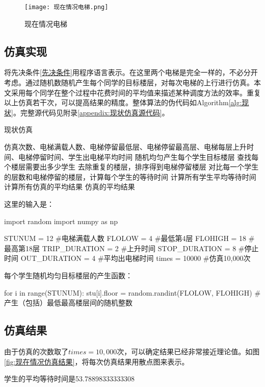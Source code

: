 \documentclass[letterpaper,12pt]{article}
\begin{document}
\begin{figure}[H]

\centering
\texttt{[image: 现在情况电梯.png]}
\caption{现在情况电梯}
\label{fig:现在情况电梯}
 
\end{figure}

\subsection{仿真实现}
将先决条件\ref{先决条件}用程序语言表示。在这里两个电梯是完全一样的，不必分开考虑。通过随机数随机产生每个同学的目标楼层，对每次电梯的上行进行仿真。本文采用每个同学在整个过程中花费时间的平均值来描述某种调度方法的效率。重复以上仿真若干次，可以提高结果的精度。整体算法的伪代码如Algorithm\ref{alg:现状}。完整源代码见附录\ref{appendix:现状仿真源代码}。
\begin{algorithm}[H]  
  \caption{现状仿真} \label{alg:现状}
  \begin{algorithmic}[1]
    \Require 仿真次数、电梯满载人数、电梯停留最低层、电梯停留最高层、电梯每层上升时间、电梯停留时间、学生出电梯平均时间
      \State 随机均匀产生每个学生目标楼层
      \State 查找每个楼层需要出多少学生
      \State 去除重复的楼层，排序得到电梯停留楼层
      \State 对比每一个学生的层数和电梯停留的楼层，计算每个学生的等待时间
      \State 计算所有学生平均等待时间
    \EndFor  
    \State 计算所有仿真的平均结果
    \Ensure 仿真的平均结果
  \end{algorithmic}  
\end{algorithm}  

这里的输入是：
\begin{python}
import random
import numpy as np

STUNUM = 12 #电梯满载人数
FLOLOW = 4 #最低第4层
FLOHIGH = 18 #最高第18层
TRIP_DURATION = 2 #上升时间
STOP_DURATION = 8 #停止时间
OUT_DURATION = 4 #平均出电梯时间
times = 10000 #仿真10,000次
\end{python}

每个学生随机均匀目标楼层的产生函数：
\begin{python}
for i in range(STUNUM):
    stu[i].floor = random.randint(FLOLOW, FLOHIGH) #产生（包括）最低最高楼层间的随机整数
\end{python}


\subsection{仿真结果}
由于仿真的次数取了$times = 10,000$次，可以确定结果已经非常接近理论值。如图\ref{fig:现在情况仿真结果}，将每次仿真结果用散点图来表示。
\begin{python}
学生的平均等待时间是53.78898333333308
\end{python}
\end{document}
